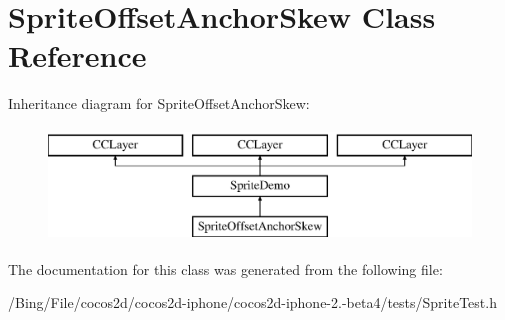 \hypertarget{interface_sprite_offset_anchor_skew}{\section{Sprite\-Offset\-Anchor\-Skew Class Reference}
\label{interface_sprite_offset_anchor_skew}
}
Inheritance diagram for Sprite\-Offset\-Anchor\-Skew\-:\begin{figure}[H]
\begin{center}
\leavevmode
\includegraphics[height=3.000000cm]{interface_sprite_offset_anchor_skew}
\end{center}
\end{figure}


The documentation for this class was generated from the following file\-:\begin{DoxyCompactItemize}
\item 
/\-Bing/\-File/cocos2d/cocos2d-\/iphone/cocos2d-\/iphone-\/2.-\/beta4/tests/Sprite\-Test.\-h\end{DoxyCompactItemize}

